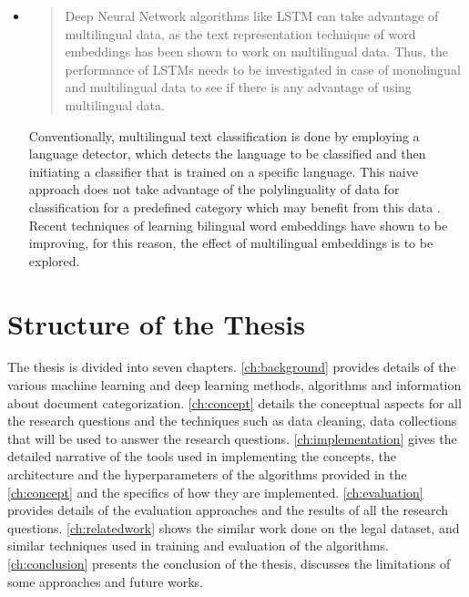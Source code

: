 \begin{itemize}
    
    \item
    \begin{quote}
      Deep Neural Network algorithms like \gls{LSTM} can take advantage of multilingual data, as the text representation technique of word embeddings has been shown to work on multilingual data. Thus, the performance of \glspl{LSTM} needs to be investigated in case of monolingual and multilingual data to see if there is any advantage of using multilingual data.
    \end{quote}
     Conventionally, multilingual text classification is done by employing a language detector, which detects the language to be classified and then initiating a classifier that is trained on a specific language. This naive approach does not take advantage of the polylinguality of data for classification for a predefined category which may benefit from this data \cite{Wei:2014:EPD:2566999.2567111}. Recent techniques of learning bilingual word embeddings \cite{D13-1141,NIPS2014_5270} have shown to be improving, for this reason, the effect of multilingual embeddings is to be explored. 
\end{itemize}

\section{Structure of the Thesis}
The thesis is divided into seven chapters. \ref{ch:background} provides details of the various machine learning and deep learning methods, algorithms and information about document categorization. \ref{ch:concept} details the conceptual aspects for all the research questions and the techniques such as data cleaning, data collections that will be used to answer the research questions. \ref{ch:implementation} gives the detailed narrative of the tools used in implementing the concepts, the architecture and the hyperparameters of the algorithms provided in the \ref{ch:concept} and the specifics of how they are implemented. \ref{ch:evaluation} provides details of the evaluation approaches and the results of all the research questions.  \ref{ch:relatedwork} shows the similar work done on the legal dataset, and similar techniques used in training and evaluation of the algorithms. \ref{ch:conclusion} presents the conclusion of the thesis, discusses the limitations of some approaches and future works. 